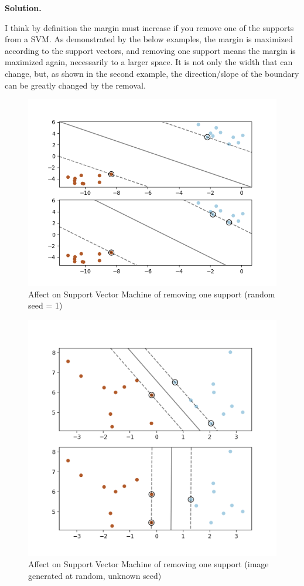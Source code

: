 \documentclass[10pt]{article}
\begin{document}
\begin{itemize}
{\bf Solution.}

I think by definition the margin must increase if you remove one of the supports from a SVM. As demonstrated by the below examples, the margin is maximized according to the support vectors, and removing one support means the margin is maximized again, necessarily to a larger space. It is not only the width that can change, but, as shown in the second example, the direction/slope of the boundary can be greatly changed by the removal.

\begin{figure}[H]
\centering
  \includegraphics[width=\linewidth]{code/svm.png}
 \caption{Affect on Support Vector Machine of removing one support (random seed = 1)}
\label{label}
\end{figure}

\begin{figure}[H]
\centering
  \includegraphics[width=\linewidth]{code/svm2.png}
 \caption{Affect on Support Vector Machine of removing one support (image generated at random, unknown seed)}
\label{label}
\end{figure}


\end{itemize}
\end{document}
